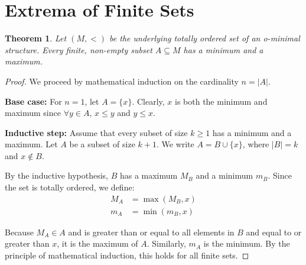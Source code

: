 \documentclass[12pt]{article}
\newtheorem{theorem}{Theorem}
\begin{document}
\section{Extrema of Finite Sets}
\begin{theorem}
Let $(M, <)$ be the underlying totally ordered set of an o-minimal structure. Every finite, non-empty subset $A \subseteq M$ has a minimum and a maximum.
\end{theorem}
\begin{proof}
We proceed by mathematical induction on the cardinality $n = |A|$.

\textbf{Base case:} For $n = 1$, let $A = \{x\}$. Clearly, $x$ is both the minimum and maximum since $\forall y \in A$, $x \le y$ and $y \le x$.

\textbf{Inductive step:} Assume that every subset of size $k \ge 1$ has a minimum and a maximum. Let $A$ be a subset of size $k + 1$. We write $A = B \cup \{x\}$, where $|B| = k$ and $x \notin B$.

By the inductive hypothesis, $B$ has a maximum $M_B$ and a minimum $m_B$. Since the set is totally ordered, we define:
\begin{align*}
M_A &= \max(M_B, x) \\
m_A &= \min(m_B, x)
\end{align*}

Because $M_A \in A$ and is greater than or equal to all elements in $B$ and equal to or greater than $x$, it is the maximum of $A$. Similarly, $m_A$ is the minimum. By the principle of mathematical induction, this holds for all finite sets.
\end{proof}
\end{document}
